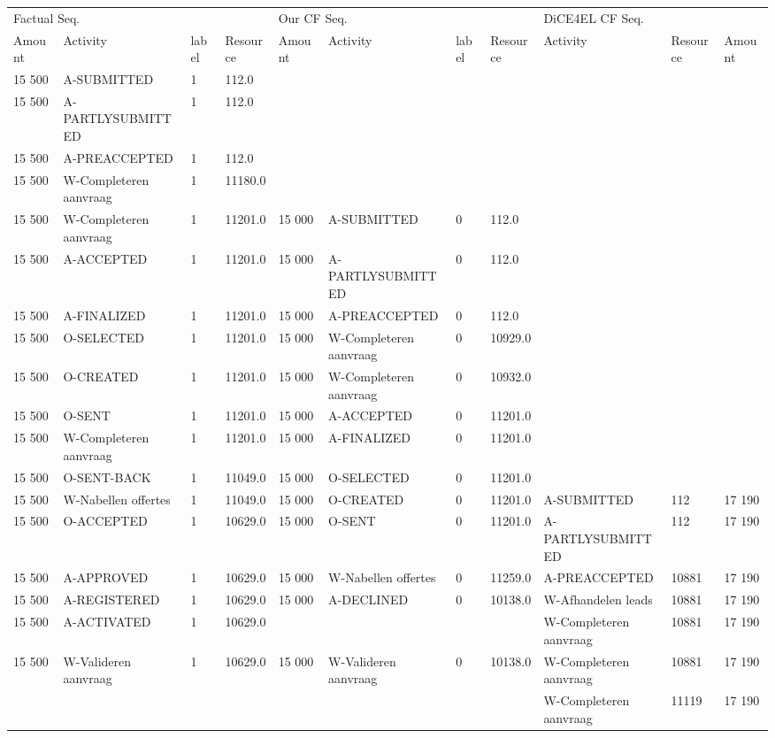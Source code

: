 \begin{tabular}{lllllllllll}
\toprule
\multicolumn{4}{l}{Factual Seq.} & \multicolumn{4}{l}{Our CF Seq.} & \multicolumn{3}{l}{DiCE4EL CF Seq.} \\
Amount & Activity & label & Resource & Amount & Activity & label & Resource & Activity & Resource & Amount \\
\midrule
15 500 & A-SUBMITTED & 1 & 112.0 &  &  &  &  &  &  &  \\
15 500 & A-PARTLYSUBMITTED & 1 & 112.0 &  &  &  &  &  &  &  \\
15 500 & A-PREACCEPTED & 1 & 112.0 &  &  &  &  &  &  &  \\
15 500 & W-Completeren aanvraag & 1 & 11180.0 &  &  &  &  &  &  &  \\
15 500 & W-Completeren aanvraag & 1 & 11201.0 & 15 000 & A-SUBMITTED & 0 & 112.0 &  &  &  \\
15 500 & A-ACCEPTED & 1 & 11201.0 & 15 000 & A-PARTLYSUBMITTED & 0 & 112.0 &  &  &  \\
15 500 & A-FINALIZED & 1 & 11201.0 & 15 000 & A-PREACCEPTED & 0 & 112.0 &  &  &  \\
15 500 & O-SELECTED & 1 & 11201.0 & 15 000 & W-Completeren aanvraag & 0 & 10929.0 &  &  &  \\
15 500 & O-CREATED & 1 & 11201.0 & 15 000 & W-Completeren aanvraag & 0 & 10932.0 &  &  &  \\
15 500 & O-SENT & 1 & 11201.0 & 15 000 & A-ACCEPTED & 0 & 11201.0 &  &  &  \\
15 500 & W-Completeren aanvraag & 1 & 11201.0 & 15 000 & A-FINALIZED & 0 & 11201.0 &  &  &  \\
15 500 & O-SENT-BACK & 1 & 11049.0 & 15 000 & O-SELECTED & 0 & 11201.0 &  &  &  \\
15 500 & W-Nabellen offertes & 1 & 11049.0 & 15 000 & O-CREATED & 0 & 11201.0 & A-SUBMITTED & 112 & 17 190 \\
15 500 & O-ACCEPTED & 1 & 10629.0 & 15 000 & O-SENT & 0 & 11201.0 & A-PARTLYSUBMITTED & 112 & 17 190 \\
15 500 & A-APPROVED & 1 & 10629.0 & 15 000 & W-Nabellen offertes & 0 & 11259.0 & A-PREACCEPTED & 10881 & 17 190 \\
15 500 & A-REGISTERED & 1 & 10629.0 & 15 000 & A-DECLINED & 0 & 10138.0 & W-Afhandelen leads & 10881 & 17 190 \\
15 500 & A-ACTIVATED & 1 & 10629.0 &  &  &  &  & W-Completeren aanvraag & 10881 & 17 190 \\
15 500 & W-Valideren aanvraag & 1 & 10629.0 & 15 000 & W-Valideren aanvraag & 0 & 10138.0 & W-Completeren aanvraag & 10881 & 17 190 \\
 &  &  &  &  &  &  &  & W-Completeren aanvraag & 11119 & 17 190 \\
\bottomrule
\end{tabular}
